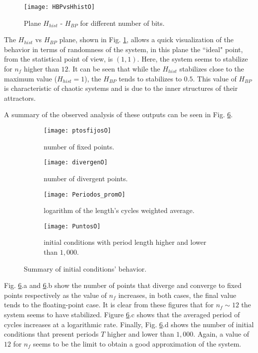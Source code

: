 \begin{figure}
    \centering
        \texttt{[image: HBPvsHhistO]}\\
    \caption{Plane $H_{hist}$ - $H_{BP}$  for different number of bits. }\label{fig:HBPvsHhist}
\end{figure}


The $H_{hist}$ vs $H_{BP}$ plane, shown in Fig. \ref{fig:HBPvsHhist}, allows a quick visualization of the behavior in terms of randomness of the system, in this plane the ``ideal" point, from the statistical point of view, is $(1,1)$. Here, the system seems to stabilize for $n_f$ higher than $12$. It can be seen that while the $H_{hist}$ stabilizes close to the maximum value ($H_{hist}=1$), the $H_{BP}$ tends to stabilizes to $0.5$. This value of $H_{BP}$ is characteristic of chaotic systems and is due to the inner structures of their attractors.

A summary of the observed analysis of these outputs can be seen in Fig. \ref{puntos}.

\begin{figure}
    \centering
    \begin{subfigure}[b]{0.49\textwidth}
        \texttt{[image: ptosfijosO]}
        \caption{number of fixed points.}
        \label{fig:gull}
    \end{subfigure}
    \hfill 
    \begin{subfigure}[b]{0.49\textwidth}
        \texttt{[image: divergenO]}
        \caption{number of divergent points.}
        \label{fig:tiger}
    \end{subfigure}
   \hfill 
    \begin{subfigure}[b]{0.49\textwidth}
        \texttt{[image: Periodos\_promO]}
        \caption{logarithm of the length's cycles weighted average.}
        \label{fig:mouse}
    \end{subfigure}
  \hfill   
    \begin{subfigure}[b]{0.49\textwidth}
        \texttt{[image: PuntosO]}
        \caption{initial conditions with period length higher and lower than $1,000$.}
        \label{fig:mouse}
    \end{subfigure}
    \caption{Summary of initial conditions' behavior.}\label{puntos}
\end{figure}


Fig. \ref{puntos}.a and \ref{puntos}.b show the
number of points that diverge and converge to fixed points
respectively as the value of $n_f$ increases, in both cases, the
final value tends to the floating-point case. It is clear from
these figures that for $n_f \sim 12$ the system seems to have stabilized. Figure
\ref{puntos}.c shows that the averaged period of cycles increases at a logarithmic rate.
Finally, Fig. \ref{puntos}.d shows the number of initial conditions that
present periods $T$ higher and lower than $1,000$. Again, a value
of $12$ for $n_f$ seems to be the limit to obtain a good
approximation of the system.

